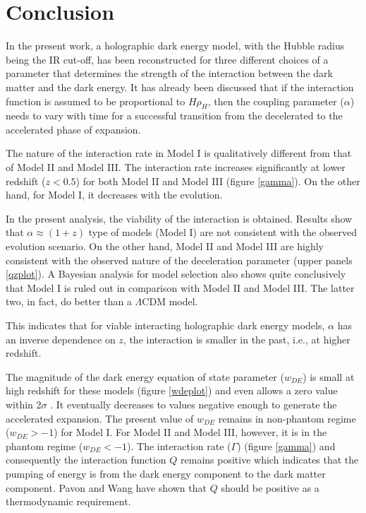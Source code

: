 \documentclass[11pt]{article}
\begin{document}
\section{Conclusion}
\label{dis}

In the present work, a holographic dark energy model, with the Hubble radius being the IR cut-off, has been reconstructed for three different choices of a parameter that determines the strength of the interaction between the dark matter and the dark energy. It has already been discussed that if the interaction function is assumed to be proportional to $H\rho_H$, then the coupling parameter ($\alpha$) needs to vary with time for a successful transition from the decelerated to the accelerated phase of expansion. 

\par The nature of the interaction rate in Model I is qualitatively different from that of Model II and Model III.  The interaction rate increases significantly at lower redshift ($z<0.5$) for both Model II and Model III (figure \ref{gamma}). On the other hand, for Model I, it decreases with the evolution.

\par In the present analysis, the viability of the interaction is obtained. Results show that $\alpha\approx(1+z)$ type of models (Model I) are not consistent with the observed evolution scenario. On the other hand, Model II and Model III are highly consistent with the observed nature of the deceleration parameter (upper panels \ref{qzplot}). A Bayesian analysis for model selection also shows quite conclusively that Model I is ruled out in comparison with Model II and Model III. The latter two, in fact, do better than a $\Lambda$CDM model.

\par This indicates that for viable interacting holographic dark energy models, $\alpha$ has an inverse dependence on $z$, the interaction is smaller in the past, i.e., at higher redshift.

\par The magnitude of the dark energy equation of state parameter ($w_{DE}$) is small at high redshift for these models (figure \ref{wdeplot}) and even allows a zero value within 2$\sigma$ . It eventually decreases to values negative enough to generate the accelerated expansion. The present value of $w_{DE}$ remains in non-phantom regime ($w_{DE}>-1$) for Model I. For Model II and Model III, however, it is in the phantom regime ($w_{DE}<-1$). The interaction rate ($\Gamma$) (figure \ref{gamma}) and consequently the interaction function $Q$ remains positive which indicates that the pumping of energy is from the dark energy component to the dark matter component. Pavon and Wang \cite{pavonwang} have shown that $Q$ should be positive as a thermodynamic requirement.
\end{document}
